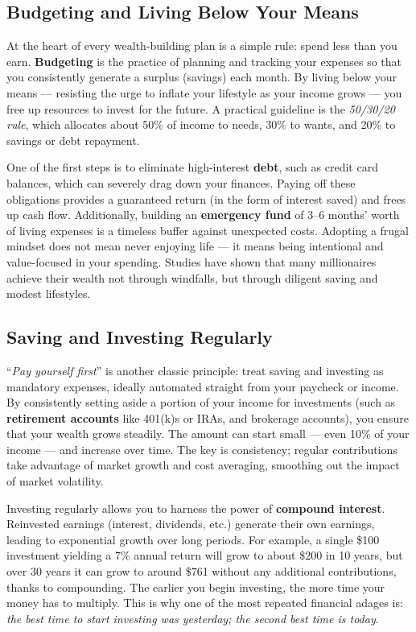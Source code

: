 \documentclass[12pt]{article}
\begin{document}
\subsection{Budgeting and Living Below Your Means}
At the heart of every wealth-building plan is a simple rule: spend less than you earn. \textbf{Budgeting} is the practice of planning and tracking your expenses so that you consistently generate a surplus (savings) each month. By living below your means --- resisting the urge to inflate your lifestyle as your income grows --- you free up resources to invest for the future. A practical guideline is the \textit{50/30/20 rule}, which allocates about 50\% of income to needs, 30\% to wants, and 20\% to savings or debt repayment.
\par
One of the first steps is to eliminate high-interest \textbf{debt}, such as credit card balances, which can severely drag down your finances. Paying off these obligations provides a guaranteed return (in the form of interest saved) and frees up cash flow. Additionally, building an \textbf{emergency fund} of 3--6 months' worth of living expenses is a timeless buffer against unexpected costs. Adopting a frugal mindset does not mean never enjoying life --- it means being intentional and value-focused in your spending. Studies have shown that many millionaires achieve their wealth not through windfalls, but through diligent saving and modest lifestyles\cite{Stanley1996}.
\subsection{Saving and Investing Regularly}
``\textit{Pay yourself first}'' is another classic principle: treat saving and investing as mandatory expenses, ideally automated straight from your paycheck or income. By consistently setting aside a portion of your income for investments (such as \textbf{retirement accounts} like 401(k)s or IRAs, and brokerage accounts), you ensure that your wealth grows steadily. The amount can start small --- even 10\% of your income --- and increase over time. The key is consistency; regular contributions take advantage of market growth and cost averaging, smoothing out the impact of market volatility.
\par
Investing regularly allows you to harness the power of \textbf{compound interest}. Reinvested earnings (interest, dividends, etc.) generate their own earnings, leading to exponential growth over long periods. For example, a single \$100 investment yielding a 7\% annual return will grow to about \$200 in 10 years, but over 30 years it can grow to around \$761 without any additional contributions, thanks to compounding. The earlier you begin investing, the more time your money has to multiply. This is why one of the most repeated financial adages is: \textit{the best time to start investing was yesterday; the second best time is today}.
\end{document}
